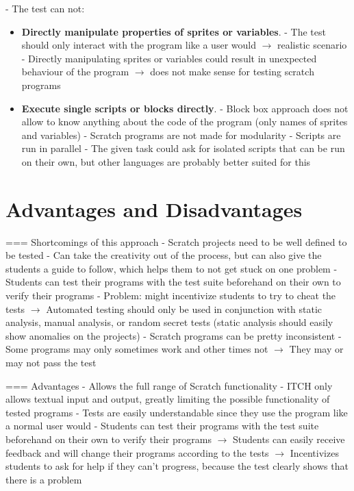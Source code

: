 \noindent- The test can not:
\begin{itemize}
    \item \textbf{Directly manipulate properties of sprites or variables}.
        - The test should only interact with the program like a user would $\rightarrow$ realistic scenario
        - Directly manipulating sprites or variables could result in unexpected behaviour of the program
        $\rightarrow$ does not make sense for testing scratch programs
    \item \textbf{Execute single scripts or blocks directly}.
        - Block box approach does not allow to know anything about the code of the program (only names of sprites and variables)
        - Scratch programs are not made for modularity
            - Scripts are run in parallel
            - The given task could ask for isolated scripts that can be run on their own, but other languages are probably better suited for this

\end{itemize}

\section{Advantages and Disadvantages}

=== Shortcomings of this approach
- Scratch projects need to be well defined to be tested
    - Can take the creativity out of the process, but can also give the students a guide to follow, which helps them to not get stuck on one problem
    - Students can test their programs with the test suite beforehand on their own to verify their programs
    - Problem: might incentivize students to try to cheat the tests
        $\rightarrow$ Automated testing should only be used in conjunction with static analysis, manual analysis, or random secret tests
        (static analysis should easily show anomalies on the projects)
- Scratch programs can be pretty inconsistent
    - Some programs may only sometimes work and other times not
    $\rightarrow$ They may or may not pass the test

=== Advantages
- Allows the full range of Scratch functionality
    - ITCH only allows textual input and output, greatly limiting the possible functionality of tested programs
- Tests are easily understandable since they use the program like a normal user would
    - Students can test their programs with the test suite beforehand on their own to verify their programs
        $\rightarrow$ Students can easily receive feedback and will change their programs according to the tests
        $\rightarrow$ Incentivizes students to ask for help if they can't progress, because the test clearly shows that there is a problem


